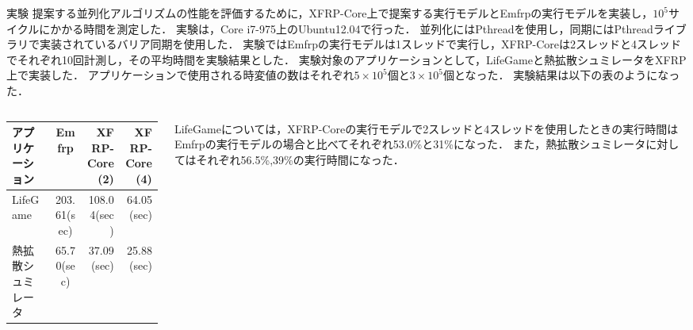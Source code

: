 \documentclass[dvipdfmx,final,t,10pt]{beamer}
\begin{document}
\begin{frame}[fragile]
    \begin{block}{実験}
        \vskip 0.2cm
            提案する並列化アルゴリズムの性能を評価するために，XFRP-Core上で提案する実行モデルとEmfrpの実行モデルを実装し，$10^5$サイクルにかかる時間を測定した．
            実験は，Core i7-975上のUbuntu12.04で行った．
            並列化にはPthreadを使用し，同期にはPthreadライブラリで実装されているバリア同期を使用した．
            実験ではEmfrpの実行モデルは1スレッドで実行し，XFRP-Coreは2スレッドと4スレッドでそれぞれ10回計測し，その平均時間を実験結果とした．
            実験対象のアプリケーションとして，LifeGameと熱拡散シュミレータをXFRP上で実装した．
            アプリケーションで使用される時変値の数はそれぞれ$5\times10^5$個と$3\times10^5$個となった．
            実験結果は以下の表のようになった．
        \begin{columns}
            \begin{column}{0.55\textwidth}
                \vskip -0.3cm
                \begin{table}
                    \begin{tabular}{|l|c|r|r|} \hline
                        アプリケーション & Emfrp & XFRP-Core(2) & XFRP-Core(4) \\ \hline
                        LifeGame & 203.61(sec) & 108.04(sec) & 64.05(sec) \\ \hline
                        熱拡散シュミレータ & 65.70(sec) & 37.09(sec) & 25.88(sec) \\ \hline
                    \end{tabular}
                \end{table}
            \end{column}
            \begin{column}{0.4\textwidth}
                LifeGameについては，XFRP-Coreの実行モデルで2スレッドと4スレッドを使用したときの実行時間はEmfrpの実行モデルの場合と比べてそれぞれ53.0\%と31\%になった．
                また，熱拡散シュミレータに対してはそれぞれ56.5\%,39\%の実行時間になった．
            \end{column}
        \end{columns} 
        \vskip -0.2cm
    \end{block}
\end{frame}
\end{document}
